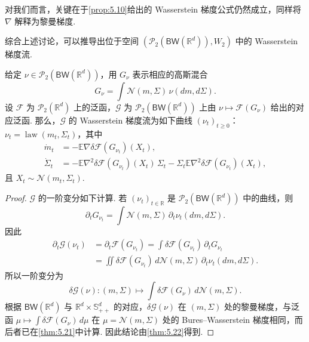 对我们而言，关键在于\autoref{prop:5.10}给出的 Wasserstein 梯度公式仍然成立，同样将 $\nabla$ 解释为黎曼梯度.

综合上述讨论，可以推导出位于空间 $(\mathcal P_2(\mathsf{BW}(\mathbb R^d)),W_2)$ 中的 Wasserstein 梯度流.

\begin{theorem}\label{thm:5.23}
给定 $\nu\in\mathcal P_2(\mathsf{BW}(\mathbb R^d))$，用 $G_\nu$ 表示相应的高斯混合
$$G_\nu=\int\mathcal N(m,\Sigma)\,\nu(dm,d\Sigma).$$
设 $\mathcal F$ 为 $\mathcal P_2(\mathbb R^d)$ 上的泛函，$\mathcal G$ 为 $\mathcal P_2(\mathsf{BW}(\mathbb R^d))$ 上由 $\nu\mapsto\mathcal F(G_\nu)$ 给出的对应泛函. 那么，$\mathcal G$ 的 Wasserstein 梯度流为如下曲线 $(\nu_t)_{t\geq0}$：$\nu_t=\operatorname{law}(m_t,\Sigma_t)$，其中
$$
\begin{aligned}
\dot m_t&=-\mathbb E\nabla\delta\mathcal F(G_{\nu_t})(X_t),\\
\dot\Sigma_t&=-\mathbb E\nabla^2\delta\mathcal F(G_{\nu_t})(X_t)\,\Sigma_t
-\Sigma_t\mathbb E\nabla^2\delta\mathcal F(G_{\nu_t})(X_t),
\end{aligned}
$$
且 $X_t\sim\mathcal N(m_t,\Sigma_t)$.
\end{theorem}
\begin{proof}
$\mathcal G$ 的一阶变分如下计算. 若 $(\nu_t)_{t\in\mathbb R}$ 是 $\mathcal P_2(\mathsf{BW}(\mathbb R^d))$ 中的曲线，则
$$\partial_tG_{\nu_t}=\int\mathcal N(m,\Sigma)\,\partial_t\nu_t(dm,d\Sigma).$$
因此
$$
\begin{aligned}
\partial_t\mathcal G(\nu_t)
&=\partial_t\mathcal F(G_{\nu_t})
=\int\delta\mathcal F(G_{\nu_t})\,\partial_tG_{\nu_t}\\
&=\iint\delta\mathcal F(G_{\nu_t})\,d\mathcal N(m,\Sigma)\,\partial_t\nu_t(dm,d\Sigma).
\end{aligned}
$$
所以一阶变分为
$$
\delta\mathcal G(\nu):(m,\Sigma)\mapsto\int\delta\mathcal F(G_\nu)\,d\mathcal N(m,\Sigma).
$$
根据 $\mathsf{BW}(\mathbb R^d)$ 与 $\mathbb R^d\times\mathbb S_{++}^d$ 的对应，$\delta\mathcal G(\nu)$ 在 $(m,\Sigma)$ 处的黎曼梯度，与泛函 $\mu\mapsto\int\delta\mathcal F(G_\nu)\,d\mu$ 在 $\mu=\mathcal N(m,\Sigma)$ 处的 Bures--Wasserstein 梯度相同，而后者已在\autoref{thm:5.21}中计算. 因此结论由\autoref{thm:5.22}得到.
\end{proof}
